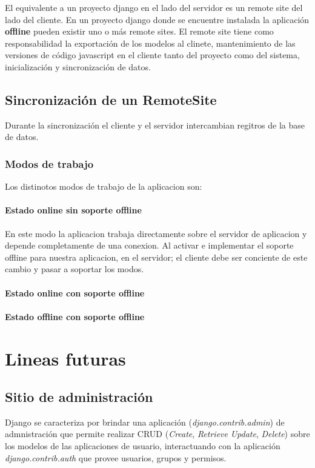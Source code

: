 \documentclass[a4paper]{report}
\begin{document}
 El equivalente a un proyecto django en el lado
del servidor es un remote site del lado del cliente. En un proyecto django donde se encuentre instalada la aplicación \textbf{offline} pueden existir uno o más remote sites.
El remote site tiene como responsabilidad la exportación de los modelos al
clinete, mantenimiento de las versiones de código javascript en el cliente
tanto del proyecto como del sistema, inicialización y sincronización de datos.

\section{Sincronización de un RemoteSite}
Durante la sincronización el cliente y el servidor intercambian regitros de 
la base de datos. 

\subsection{Modos de trabajo}
Los distinotos modos de trabajo de la aplicacion son:
\subsubsection{Estado online sin soporte offline}
En este modo la aplicacion trabaja directamente sobre el servidor de aplicacion
y depende completamente de una conexion.
Al activar e implementar el soporte offline para nuestra aplicacion, en el
servidor; el cliente debe ser conciente de este cambio y pasar a soportar los
modos.
\subsubsection{Estado online con soporte offline}
\subsubsection{Estado offline con soporte offline}

\chapter{Lineas futuras}
\section{Sitio de administración}
Django se caracteriza por brindar una aplicación (\textit{django.contrib.admin})
de admnistración que permite realizar CRUD (\textit{Create}, \textit{Retrieve}
\textit{Update}, \textit{Delete}) sobre los modelos de las aplicaciones de
usuario, interactuando con la aplicación \textit{django.contrib.auth} que provee
usuarios, grupos y permisos.
 
\end{document}
